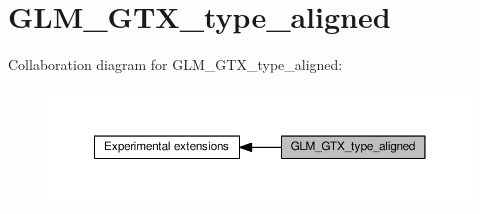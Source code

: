 \hypertarget{group__gtx__type__aligned}{}\section{G\+L\+M\+\_\+\+G\+T\+X\+\_\+type\+\_\+aligned}
\label{group__gtx__type__aligned}
Collaboration diagram for G\+L\+M\+\_\+\+G\+T\+X\+\_\+type\+\_\+aligned\+:
\nopagebreak
\begin{figure}[H]
\begin{center}
\leavevmode
\includegraphics[width=350pt]{da/dba/group__gtx__type__aligned}
\end{center}
\end{figure}
